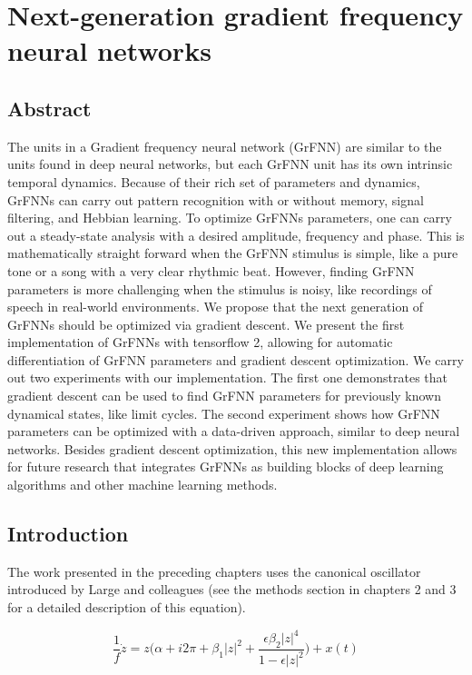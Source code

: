 \documentclass{report}
\begin{document}
\chapter{Next-generation gradient frequency neural networks}

\section{Abstract}
The units in a Gradient frequency neural network (GrFNN) are similar to the units found in deep neural networks, but each GrFNN unit has its own intrinsic temporal dynamics. Because of their rich set of parameters and dynamics, GrFNNs can carry out pattern recognition with or without memory, signal filtering, and Hebbian learning. To optimize GrFNNs parameters, one can carry out a steady-state analysis with a desired amplitude, frequency and phase. This is mathematically straight forward when the GrFNN stimulus is simple, like a pure tone or a song with a very clear rhythmic beat. However, finding GrFNN parameters is more challenging when the stimulus is noisy, like recordings of speech in real-world environments. We propose that the next generation of GrFNNs should be optimized via gradient descent. We present the first implementation of GrFNNs with tensorflow 2, allowing for automatic differentiation of GrFNN parameters and gradient descent optimization. We carry out two experiments with our implementation. The first one demonstrates that gradient descent can be used to find GrFNN parameters for previously known dynamical states, like limit cycles. The second experiment shows how GrFNN parameters can be optimized with a data-driven approach, similar to deep neural networks. Besides gradient descent optimization, this new implementation allows for future research that integrates GrFNNs as building blocks of deep learning algorithms and other machine learning methods.

\section{Introduction}

The work presented in the preceding chapters uses the canonical oscillator introduced by Large and colleagues \cite{large2010canonical} (see the methods section in chapters 2 and 3 for a detailed description of this equation).  

\begin{equation}
\frac{1}{f}\dot{z} = z\bigg(\alpha + i2\pi + \beta_1|z|^2 + \frac{\epsilon\beta_2|z|^4}{1-\epsilon|z|^2}\bigg) + x(t) \label{eq:5.1}
\end{equation}
\end{document}
